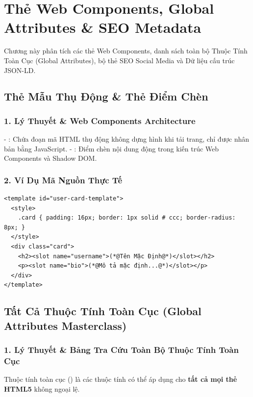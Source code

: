 \chapter{Thẻ Web Components, Global Attributes \& SEO Metadata}
\label{chap:web_components_seo}

Chương này phân tích các thẻ Web Components, danh sách toàn bộ Thuộc Tính Toàn Cục (Global Attributes), bộ thẻ SEO Social Media và Dữ liệu cấu trúc JSON-LD.

\section{Thẻ Mẫu Thụ Động  \& Thẻ Điểm Chèn }
\subsection{1. Lý Thuyết \& Web Components Architecture}
- : Chứa đoạn mã HTML thụ động không dựng hình khi tải trang, chỉ được nhân bản bằng JavaScript.
- : Điểm chèn nội dung động trong kiến trúc Web Components và Shadow DOM.

\subsection{2. Ví Dụ Mã Nguồn Thực Tế}
\begin{lstlisting}[language=HTML5, caption={Ví dụ định nghĩa thẻ template và named slot}]
<template id="user-card-template">
  <style>
    .card { padding: 16px; border: 1px solid # ccc; border-radius: 8px; }
  </style>
  <div class="card">
    <h2><slot name="username">(*@Tên Mặc Định@*)</slot></h2>
    <p><slot name="bio">(*@Mô tả mặc định...@*)</slot></p>
  </div>
</template>
\end{lstlisting}

\section{Tất Cả Thuộc Tính Toàn Cục (Global Attributes Masterclass)}
\subsection{1. Lý Thuyết \& Bảng Tra Cứu Toàn Bộ Thuộc Tính Toàn Cục}
Thuộc tính toàn cục () là các thuộc tính có thể áp dụng cho \textbf{tất cả mọi thẻ HTML5} không ngoại lệ.

